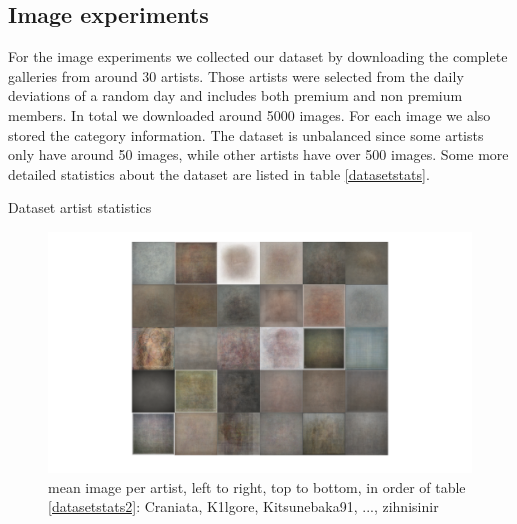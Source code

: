 \subsection{Image experiments}
For the image experiments we collected our dataset by downloading the complete galleries from around 30 artists.
Those artists were selected from the daily deviations of a random day and includes both premium and non premium members.
In total we downloaded around 5000 images. 
For each image we also stored the category information.
The dataset is unbalanced since some artists only have around 50 images, while other artists have over 500 images.
Some more detailed statistics about the dataset are listed in table \ref{datasetstats}.


\begin{table}[htb]
    \caption{Dataset artist statistics}
    \label{datasetstats2}
\end{table}

\begin{figure}[htb]
  \includegraphics[width=1\linewidth]{img/datasetAvg.png}
  \caption{mean image per artist, left to right, top to bottom, in order of table \ref{datasetstats2}: Craniata, K1lgore, Kitsunebaka91, ..., zihnisinir }
  \label{fig:avgDataset}
\end{figure}



